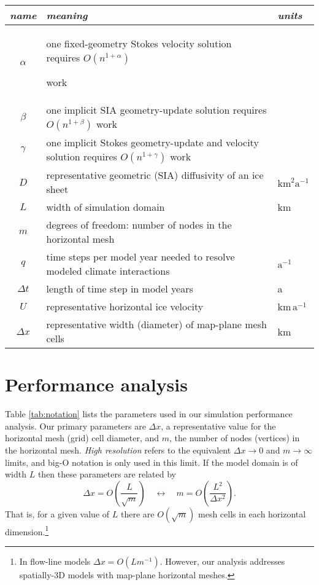 \documentclass[twocolumn,letterpaper]{igs}
\begin{document}
\begin{table*}[ht]
{\normalsize
\begin{tabular}{cll}
\emph{name} & \emph{meaning} & \emph{units} \\ \hline
$\alpha$    & one fixed-geometry Stokes velocity solution requires $O(n^{1+\alpha})${\large \strut} work\\
$\beta$     & one implicit SIA geometry-update solution requires $O(n^{1+\beta})$ work \\
$\gamma$    & one implicit Stokes geometry-update and velocity solution requires $O(n^{1+\gamma})$ work \\
$D$         & representative geometric (SIA) diffusivity of an ice sheet & $\text{km}^2 \text{a}^{-1}$ \\
$L$         & width of simulation domain & km \\
$m$         & degrees of freedom: number of nodes in the horizontal mesh \\
$q$         & time steps per model year needed to resolve modeled climate interactions & $\text{a}^{-1}$ \\
$\Delta t$  & length of time step in model years & a \\
$U$         & representative horizontal ice velocity & $\text{km}\,\text{a}^{-1}$ \\
$\Delta x$  & representative width (diameter) of map-plane mesh cells & km
\end{tabular}
}
\caption{Parameters for performance analysis; $\alpha,\beta,\gamma,n$ are pure numbers.}
\label{tab:notation}
\end{table*}


\section{Performance analysis}

Table \ref{tab:notation} lists the parameters used in our simulation performance  analysis.  Our primary parameters are $\Delta x$, a representative value for the horizontal mesh (grid) cell diameter, and $m$, the number of nodes (vertices) in the horizontal mesh.  \emph{High resolution} refers to the equivalent $\Delta x\to 0$ and $m\to\infty$ limits, and big-O notation is only used in this limit.  If the model domain is of width $L$ then these parameters are related by
\begin{equation}
\Delta x = O\left(\frac{L}{\sqrt{m}}\right) \quad \leftrightarrow \quad m = O\left(\frac{L^2}{\Delta x^2}\right).  \label{eq:paramrelation}
\end{equation}
That is, for a given value of $L$ there are $O(\sqrt{m})$ mesh cells in each horizontal dimension.\footnote{In flow-line models $\Delta x = O(L m^{-1})$.  However, our analysis addresses spatially-3D models with map-plane horizontal meshes.}
\end{document}
